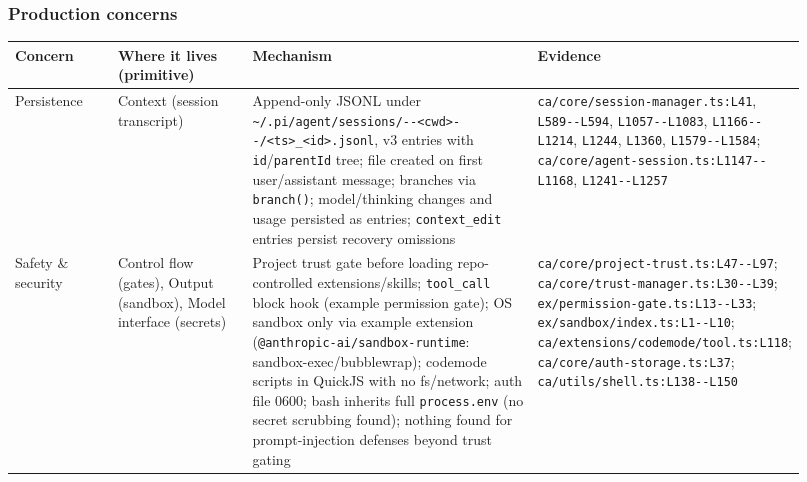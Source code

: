 \subsubsection*{Production concerns}
\begin{longtable}{@{}p{0.13\linewidth}p{0.17\linewidth}p{0.36\linewidth}p{0.26\linewidth}@{}}
\toprule \textbf{Concern} & \textbf{Where it lives (primitive)} & \textbf{Mechanism} & \textbf{Evidence} \\ \midrule \endhead
Persistence & Context (session transcript) & Append-only JSONL under \texttt{\textasciitilde{}/\allowbreak{}.\allowbreak{}pi/\allowbreak{}agent/\allowbreak{}sessions/\allowbreak{}-\allowbreak{}-\allowbreak{}<cwd>-\allowbreak{}-\allowbreak{}/\allowbreak{}<ts>\_\allowbreak{}<id>.\allowbreak{}jsonl}, v3 entries with \texttt{id}/\texttt{parentId} tree; file created on first user/assistant message; branches via \texttt{branch(\allowbreak{})}; model/thinking changes and usage persisted as entries; \texttt{context\_\allowbreak{}edit} entries persist recovery omissions & \texttt{ca/\allowbreak{}core/\allowbreak{}session-\allowbreak{}manager.\allowbreak{}ts:\allowbreak{}L41}, \texttt{L589-\allowbreak{}-\allowbreak{}L594}, \texttt{L1057-\allowbreak{}-\allowbreak{}L1083}, \texttt{L1166-\allowbreak{}-\allowbreak{}L1214}, \texttt{L1244}, \texttt{L1360}, \texttt{L1579-\allowbreak{}-\allowbreak{}L1584}; \texttt{ca/\allowbreak{}core/\allowbreak{}agent-\allowbreak{}session.\allowbreak{}ts:\allowbreak{}L1147-\allowbreak{}-\allowbreak{}L1168}, \texttt{L1241-\allowbreak{}-\allowbreak{}L1257} \\
Safety \& security & Control flow (gates), Output (sandbox), Model interface (secrets) & Project trust gate before loading repo-controlled extensions/skills; \texttt{tool\_\allowbreak{}call} block hook (example permission gate); OS sandbox only via example extension (\texttt{@anthropic-\allowbreak{}ai/\allowbreak{}sandbox-\allowbreak{}runtime}: sandbox-exec/bubblewrap); codemode scripts in QuickJS with no fs/network; auth file 0600; bash inherits full \texttt{process.\allowbreak{}env} (no secret scrubbing found); nothing found for prompt-injection defenses beyond trust gating & \texttt{ca/\allowbreak{}core/\allowbreak{}project-\allowbreak{}trust.\allowbreak{}ts:\allowbreak{}L47-\allowbreak{}-\allowbreak{}L97}; \texttt{ca/\allowbreak{}core/\allowbreak{}trust-\allowbreak{}manager.\allowbreak{}ts:\allowbreak{}L30-\allowbreak{}-\allowbreak{}L39}; \texttt{ex/\allowbreak{}permission-\allowbreak{}gate.\allowbreak{}ts:\allowbreak{}L13-\allowbreak{}-\allowbreak{}L33}; \texttt{ex/\allowbreak{}sandbox/\allowbreak{}index.\allowbreak{}ts:\allowbreak{}L1-\allowbreak{}-\allowbreak{}L10}; \texttt{ca/\allowbreak{}extensions/\allowbreak{}codemode/\allowbreak{}tool.\allowbreak{}ts:\allowbreak{}L118}; \texttt{ca/\allowbreak{}core/\allowbreak{}auth-\allowbreak{}storage.\allowbreak{}ts:\allowbreak{}L37}; \texttt{ca/\allowbreak{}utils/\allowbreak{}shell.\allowbreak{}ts:\allowbreak{}L138-\allowbreak{}-\allowbreak{}L150} \\

\end{longtable}
